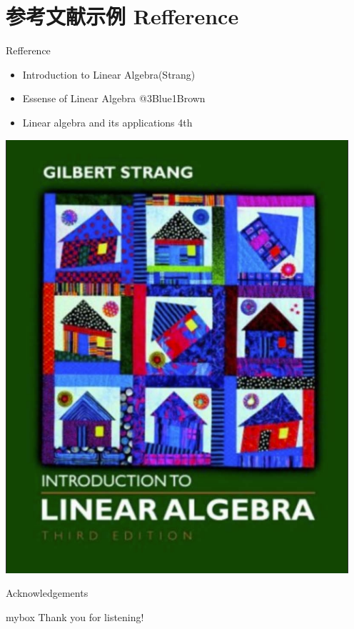 \documentclass[10pt,aspectratio=43,mathserif,table]{beamer}
\begin{document}
\section{参考文献示例 Refference}
\begin{frame}{Refference}
	\begin{multicols}{2}
		\begin{itemize}
			\item Introduction to Linear Algebra(Strang)
			\item Essense of Linear Algebra @3Blue1Brown
			\item Linear algebra and its applications 4th
		\end{itemize}
		\includegraphics[scale=0.3]{fig/ref1.png}
	\end{multicols}
\end{frame}



\begin{frame}{Acknowledgements}
	\begin{center}
		\begin{minipage}{1\textwidth}
			\begin{beamercolorbox}[wd=0.70\textwidth, rounded=true, shadow=true]{mybox}
				\LARGE \centering Thank you for listening!  %
			\end{beamercolorbox}
		\end{minipage}
	\end{center}
\end{frame}

\end{document}
